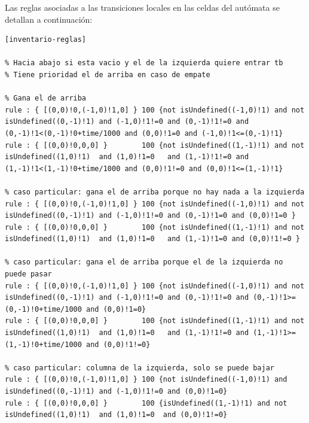 \documentclass[10pt]{article}
\begin{document}

Las reglas asociadas a las transiciones locales en las celdas del autómata se detallan a continuación:

\begin{minipage}{1\textwidth}
	\centering
	\begin{lstlisting}
[inventario-reglas]

% Hacia abajo si esta vacio y el de la izquierda quiere entrar tb
% Tiene prioridad el de arriba en caso de empate

% Gana el de arriba
rule : { [(0,0)!0,(-1,0)!1,0] } 100 {not isUndefined((-1,0)!1) and not isUndefined((0,-1)!1) and (-1,0)!1!=0 and (0,-1)!1!=0 and (0,-1)!1<(0,-1)!0+time/1000 and (0,0)!1=0 and (-1,0)!1<=(0,-1)!1}
rule : { [(0,0)!0,0,0] }        100 {not isUndefined((1,-1)!1) and not isUndefined((1,0)!1)  and (1,0)!1=0   and (1,-1)!1!=0 and (1,-1)!1<(1,-1)!0+time/1000 and (0,0)!1!=0 and (0,0)!1<=(1,-1)!1}

% caso particular: gana el de arriba porque no hay nada a la izquierda
rule : { [(0,0)!0,(-1,0)!1,0] } 100 {not isUndefined((-1,0)!1) and not isUndefined((0,-1)!1) and (-1,0)!1!=0 and (0,-1)!1=0 and (0,0)!1=0 }
rule : { [(0,0)!0,0,0] }        100 {not isUndefined((1,-1)!1) and not isUndefined((1,0)!1)  and (1,0)!1=0   and (1,-1)!1=0 and (0,0)!1!=0 }

% caso particular: gana el de arriba porque el de la izquierda no puede pasar
rule : { [(0,0)!0,(-1,0)!1,0] } 100 {not isUndefined((-1,0)!1) and not isUndefined((0,-1)!1) and (-1,0)!1!=0 and (0,-1)!1!=0 and (0,-1)!1>=(0,-1)!0+time/1000 and (0,0)!1=0}
rule : { [(0,0)!0,0,0] }        100 {not isUndefined((1,-1)!1) and not isUndefined((1,0)!1)  and (1,0)!1=0   and (1,-1)!1!=0 and (1,-1)!1>=(1,-1)!0+time/1000 and (0,0)!1!=0}

% caso particular: columna de la izquierda, solo se puede bajar
rule : { [(0,0)!0,(-1,0)!1,0] } 100 {not isUndefined((-1,0)!1) and isUndefined((0,-1)!1) and (-1,0)!1!=0 and (0,0)!1=0}
rule : { [(0,0)!0,0,0] }        100 {isUndefined((1,-1)!1) and not isUndefined((1,0)!1)  and (1,0)!1=0  and (0,0)!1!=0}
	\end{lstlisting}
\end{minipage}
\end{document}

